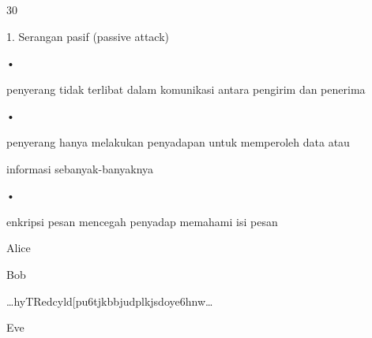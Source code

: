 \documentclass{article}
\begin{document}

30

1. Serangan pasif (passive attack) 

•

penyerang tidak terlibat dalam komunikasi  antara pengirim dan penerima

•

penyerang hanya melakukan penyadapan untuk memperoleh data atau     

informasi sebanyak-banyaknya

•

enkripsi pesan mencegah penyadap memahami isi pesan

Alice

Bob

…hyTRedcyld[pu6tjkbbjudplkjsdoye6hnw…

Eve
\end{document}
